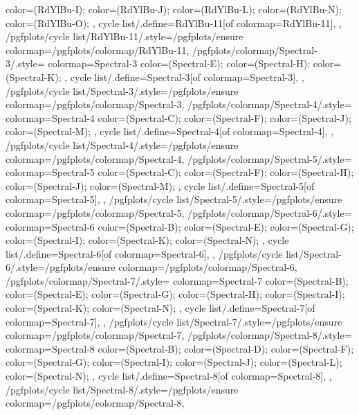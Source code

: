 {{{      color=(RdYlBu-I);
      color=(RdYlBu-J);
      color=(RdYlBu-L);
      color=(RdYlBu-N);
      color=(RdYlBu-O);
    },
    cycle list/.define={RdYlBu-11}{[of colormap=RdYlBu-11]},
  },
  /pgfplots/cycle list/RdYlBu-11/.style={/pgfplots/ensure colormap={/pgfplots/colormap/RdYlBu-11}},
  /pgfplots/colormap/Spectral-3/.style={
    colormap={Spectral-3}{
      color=(Spectral-E);
      color=(Spectral-H);
      color=(Spectral-K);
    },
    cycle list/.define={Spectral-3}{[of colormap=Spectral-3]},
  },
  /pgfplots/cycle list/Spectral-3/.style={/pgfplots/ensure colormap={/pgfplots/colormap/Spectral-3}},
  /pgfplots/colormap/Spectral-4/.style={
    colormap={Spectral-4}{
      color=(Spectral-C);
      color=(Spectral-F);
      color=(Spectral-J);
      color=(Spectral-M);
    },
    cycle list/.define={Spectral-4}{[of colormap=Spectral-4]},
  },
  /pgfplots/cycle list/Spectral-4/.style={/pgfplots/ensure colormap={/pgfplots/colormap/Spectral-4}},
  /pgfplots/colormap/Spectral-5/.style={
    colormap={Spectral-5}{
      color=(Spectral-C);
      color=(Spectral-F);
      color=(Spectral-H);
      color=(Spectral-J);
      color=(Spectral-M);
    },
    cycle list/.define={Spectral-5}{[of colormap=Spectral-5]},
  },
  /pgfplots/cycle list/Spectral-5/.style={/pgfplots/ensure colormap={/pgfplots/colormap/Spectral-5}},
  /pgfplots/colormap/Spectral-6/.style={
    colormap={Spectral-6}{
      color=(Spectral-B);
      color=(Spectral-E);
      color=(Spectral-G);
      color=(Spectral-I);
      color=(Spectral-K);
      color=(Spectral-N);
    },
    cycle list/.define={Spectral-6}{[of colormap=Spectral-6]},
  },
  /pgfplots/cycle list/Spectral-6/.style={/pgfplots/ensure colormap={/pgfplots/colormap/Spectral-6}},
  /pgfplots/colormap/Spectral-7/.style={
    colormap={Spectral-7}{
      color=(Spectral-B);
      color=(Spectral-E);
      color=(Spectral-G);
      color=(Spectral-H);
      color=(Spectral-I);
      color=(Spectral-K);
      color=(Spectral-N);
    },
    cycle list/.define={Spectral-7}{[of colormap=Spectral-7]},
  },
  /pgfplots/cycle list/Spectral-7/.style={/pgfplots/ensure colormap={/pgfplots/colormap/Spectral-7}},
  /pgfplots/colormap/Spectral-8/.style={
    colormap={Spectral-8}{
      color=(Spectral-B);
      color=(Spectral-D);
      color=(Spectral-F);
      color=(Spectral-G);
      color=(Spectral-I);
      color=(Spectral-J);
      color=(Spectral-L);
      color=(Spectral-N);
    },
    cycle list/.define={Spectral-8}{[of colormap=Spectral-8]},
  },
  /pgfplots/cycle list/Spectral-8/.style={/pgfplots/ensure colormap={/pgfplots/colormap/Spectral-8}},
}
